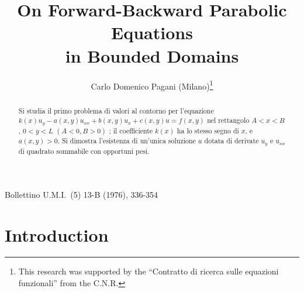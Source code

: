 \documentclass[a4paper,12pt,leqno]{article}
\title{On Forward-Backward Parabolic Equations \\ in Bounded Domains}
\author{Carlo Domenico Pagani (Milano)\texorpdfstring{\thanks{This research was supported by the ``Contratto di ricerca sulle equazioni funzionali'' from the C.N.R.}}{}}
\date{}
\numberwithin{equation}{section}
\begin{document}
\noindent
Bollettino U.M.I.\ (5) 13-B (1976), 336-354

{\let\newpage\relax\maketitle}

\maketitle

\renewcommand*\abstractname{Sunto}

\begin{abstract}
	Si studia il primo problema di valori al contorno per l'equazione $k(x) u_{y}-a(x, y) u_{x x}+b(x, y) u_{x}+c(x, y) u=f(x, y)$ nel rettangolo $A<x<B$, $0<y<L$ $(A<0, B>0)$
	; il coefficiente $k(x)$ ha lo stesso segno di $x$, e $a(x, y)>0$. Si dimostra l'esistenza di un'unica soluzione $u$ dotata di derivate $u_{y}$ e $u_{xx}$ di quadrato sommabile con opportuni pesi.
\end{abstract}

\section{Introduction}
\end{document}
